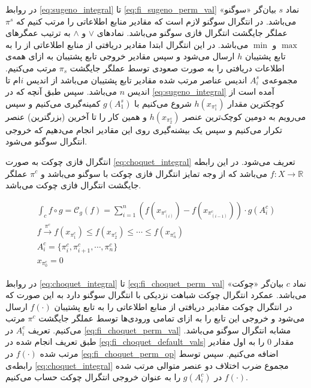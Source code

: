 در روابط
\ref{eq:sugeno_integral} تا \ref{eq:fi_sugeno_perm_val}
نماد $s$ بیان‌گر «سوگنو» می‌‌باشد. در انتگرال‌ سوگنو لازم است که مقادیر منابع اطلاعاتی را مرتب کنیم که $\pi^s$ عملگر جایگشت انتگرال فازی سوگنو می‌باشد. نمادهای $\vee$ و $\wedge$ به ترتیب عمگرهای $\max$ و $\min$ می‌باشد. در این انتگرال ابتدا مقادیر دریافتی از منابع اطلاعاتی از را به تابع پشتیبان $h$ ارسال می‌شود و سپس مقادیر خروجی تابع پشتیبان به ازای همه‌ی اطلاعات دریافتی را به صورت صعودی توسط عملگر جایگشت $\pi_s$ مرتب می‌کنیم. مجموعه‌ی $A_i^s$ اندیس عناصر مرتب شده مقادیر تابع پشتیبان می‌باشد از اندیس $i$ام تا اندیس $n$ می‌باشد. سپس طبق آنچه که در \ref{eq:sugeno_integral} آمده است از کوچکترین مقدار $h(x_{\pi_1^s})$ شروع می‌کنیم با $g(A_1^s)$ کمینه‌گیری می‌کنیم و سپس می‌رویم به دومین کوچک‌ترین عنصر $h(x_{\pi_2^s})$ و همین کار را تا آخرین (بزرگترین) عنصر تکرار می‌کنیم و سپس یک بیشنه‌گیری روی این مقادیر انجام می‌دهیم که خروجی انتگرال سوگنو می‌شود.

انتگرال فازی چوکت به صورت \ref{eq:choquet_integral} تعریف می‌شود. در این رابطه
$f : X \rightarrow \mathbb{R}$
می‌باشد که از وجه تمایز انتگرال فازی چوکت با سوگنو می‌‌باشد و $\pi^c$ عملگر جایگشت انتگرال فازی چوکت می‌باشد.

\begin{eqnarray}
\int_{c} f \circ g = \mathcal{C}_g(f) = \sum_{i = 1}^{n} \left( f(x_{\pi_{(i)}^c}) - f(x_{\pi_{(i-1)}^c}) \right) \cdot g(A_i^c)\label{eq:choquet_integral}\\
f \xrightarrow{\pi^c} f(x_{\pi_1^c}) \leq f(x_{\pi_2^c}) \leq \cdots \leq f(x_{\pi_n^c})\label{eq:fi_choquet_perm_op}\\
A_i^c = \{\pi_i^c, \pi_{i+1}^c, \cdots, \pi_n^c\}\label{eq:fi_choquet_perm_val}\\
x_{\pi^c_0} = 0\label{eq:fi_choquet_default_vals}
\end{eqnarray}

در روابط
\ref{eq:choquet_integral} تا \ref{eq:fi_choquet_perm_val}
نماد $c$ بیان‌گر «چوکت» می‌‌باشد. عمکرد انتگرال چوکت شباهت نزدیکی با انتگرال سوگنو دارد به این صورت که در انتگرال چوکت مقادیر دریافتی از منابع اطلاعاتی را به تابع پشتیبان $f(\cdot)$ ارسال می‌شود و خروجی این تابع را به ازای تمامی ورودی‌ها توسط عملگر جایگشت $\pi^c$ مرتب می‌کنیم. تعریف $A_i^c$ در \ref{eq:fi_choquet_perm_val} مشابه انتگرال سوگنو می‌باشد. طبق تعریف انجام شده در \ref{eq:fi_choquet_default_vals} مقدار 0 را به اول مقادیر مرتب شده $f(\cdot)$ در \ref{eq:fi_choquet_perm_op} اضافه می‌کنیم. سپس توسط رابطه‌ی \ref{eq:choquet_integral} مجموع ضرب اختلاف دو عنصر متوالی مرتب شده $f(\cdot)$ در $g(A_i^c)$ را به عنوان خروجی انتگرال چوکت حساب می‌کنیم.

